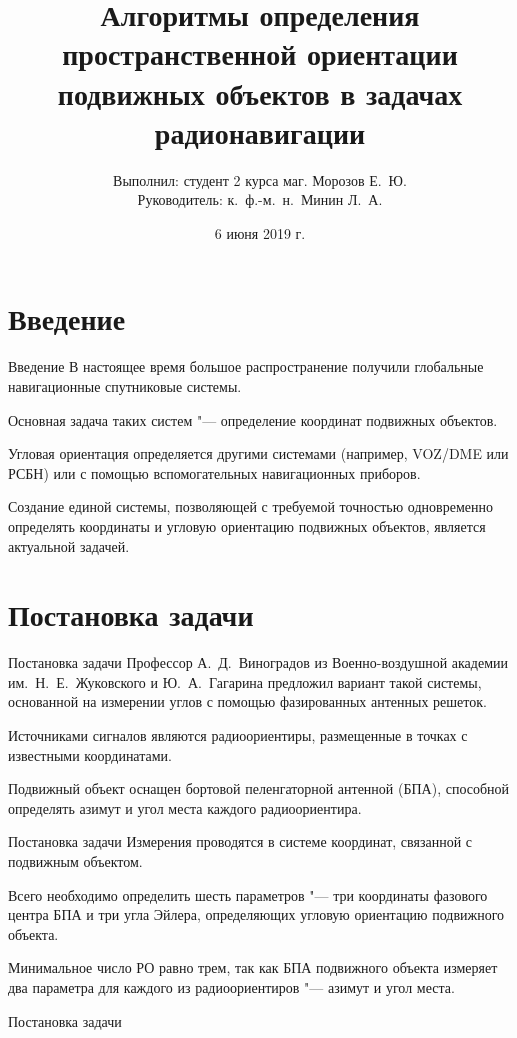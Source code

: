 \documentclass[russian,hyperref={unicode}]{beamer}
\title{Алгоритмы определения пространственной ориентации подвижных объектов в задачах радионавигации}
\institute
{
  Воронежский Государственный Университет \\
  Факультет Компьютерных Наук \\
  Кафедра Цифровых Технологий
}
\author
{
  Выполнил: студент 2 курса маг. Морозов Е.~Ю. \\
  Руководитель: к.~ф.-м.~н.~Минин Л.~А.
}
\date{6 июня 2019 г.}
\begin{document}
  \frame{\titlepage}

  \section{Введение}
  \begin{frame}{Введение}
    В настоящее время большое распространение получили глобальные навигационные спутниковые системы.

    Основная задача таких систем "--- определение координат подвижных объектов.

    Угловая ориентация определяется другими системами (например, VOZ/DME или РСБН) или с помощью вспомогательных навигационных приборов.

    Создание единой системы, позволяющей с требуемой точностью одновременно определять координаты и угловую ориентацию подвижных объектов, является актуальной задачей.~\nocite{WMMU:2019:IIS, WMMU:2019:RLNC, WMM:2018}
  \end{frame}

  \section{Постановка задачи}
  \begin{frame}{Постановка задачи}
    Профессор А.~Д.~Виноградов из Военно-воздушной академии им.~Н.~Е.~Жуковского и Ю.~А.~Гагарина предложил вариант такой системы, основанной на измерении углов с помощью фазированных антенных решеток.

    Источниками сигналов являются радиоориентиры, размещенные в точках с известными координатами.

    Подвижный объект оснащен бортовой пеленгаторной антенной (БПА), способной определять азимут и угол места каждого радиоориентира.
  \end{frame}

  \begin{frame}{Постановка задачи}
    Измерения проводятся в системе координат, связанной с подвижным объектом.

    Всего необходимо определить шесть параметров "--- три координаты фазового центра БПА и три угла Эйлера, определяющих угловую ориентацию подвижного объекта.

    Минимальное число РО равно трем, так как БПА подвижного объекта измеряет два параметра для каждого из радиоориентиров "--- азимут и угол места.
  \end{frame}

  \begin{frame}{Постановка задачи}
    \begin{columns}[c]
      \begin{column}{.5\textwidth}
      \end{column}
      \begin{column}{.5\textwidth}
        \begin{center}
        \end{center}
      \end{column}
    \end{columns}
  \end{frame}
\end{document}
